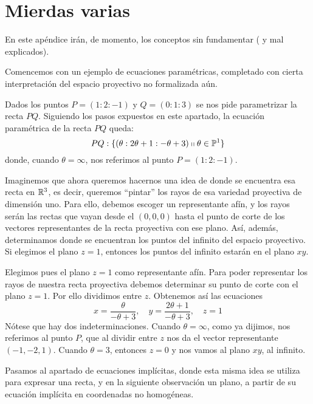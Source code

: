 \chapter{Mierdas varias}

En este apéndice irán, de momento, los conceptos sin fundamentar ( y mal explicados).

Comencemos con un ejemplo de ecuaciones paramétricas, completado con cierta interpretación del espacio proyectivo no formalizada aún.

\begin{exa}
	Dados los puntos $P=(1:2:-1)$ y $Q=(0:1:3)$ se nos pide parametrizar la recta $PQ$. Siguiendo los pasos expuestos en este apartado, la ecuación paramétrica de la recta $PQ$ queda:
	\[
	PQ:\{(\theta:2\theta+1:-\theta+3)\shortparallel\theta\in\mathbb{P}^1\}
	\]
	donde, cuando $\theta=\infty$, nos referimos al punto $P=(1:2:-1)$.
	
	Imaginemos que ahora queremos hacernos una idea de donde se encuentra esa recta en $\mathbb{R}^3$, es decir, queremos ``pintar'' los rayos de esa variedad proyectiva de dimensión uno. Para ello, debemos escoger un representante afín, y los rayos serán las rectas que vayan desde el $(0,0,0)$ hasta el punto de corte de los vectores representantes de la recta proyectiva con ese plano. Así, además, determinamos donde se encuentran los puntos del infinito del espacio proyectivo. Si elegimos el plano $z=1$, entonces los puntos del infinito estarán en el plano $xy$. 
	
	Elegimos pues el plano $z=1$ como representante afín. Para poder representar los rayos de nuestra recta proyectiva debemos determinar su punto de corte con el plano $z=1$. Por ello dividimos entre $z$. Obtenemos así las ecuaciones
	\begin{equation*}
		x=\frac{\theta}{-\theta+3}, \quad y=\frac{2\theta+1}{-\theta+3}, \quad z=1
	\end{equation*}
	Nótese que hay dos indeterminaciones. Cuando $\theta=\infty$, como ya dijimos, nos referimos al punto $P$, que al dividir entre $z$ nos da el vector representante $(-1,-2,1)$. Cuando $\theta=3$, entonces $z=0$ y nos vamos al plano $xy$, al infinito.
\end{exa}

Pasamos al apartado de ecuaciones implícitas, donde esta misma idea se utiliza para expresar una recta, y en la siguiente observación un plano, a partir de su ecuación implícita en coordenadas no homogéneas.

